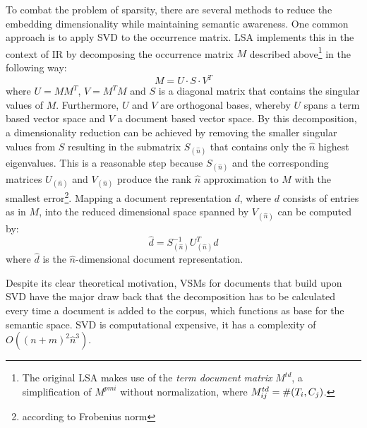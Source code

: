 To combat the problem of sparsity, there are several methods to reduce the embedding dimensionality while maintaining semantic awareness. One common approach is to apply \ac{SVD} \autocite{beltrami_sulle_1873} to the occurrence matrix. \ac{LSA} \autocite{deerwester_indexing_1990} implements this in the context of \ac{IR} by decomposing the occurrence matrix $M$ described above\footnote{The original \ac{LSA} makes use of the \textit{term document matrix} $M^{td}$, a simplification of $M^{pmi}$ without normalization, where $M^{td}_{ij} =\nobreak \#(T_i, C_j)$.} in the following way:
\begin{equation}
M = U \cdot S \cdot V^T
\end{equation}
where $U = MM^T$, $V = M^TM$ and $S$ is a diagonal matrix that contains the singular values of $M$. Furthermore, $U$ and $V$ are orthogonal bases, whereby $U$ spans a term based vector space and $V$ a document based vector space. By this decomposition, a dimensionality reduction can be achieved by removing the smaller singular values from $S$ resulting in the submatrix $S_{(\hat{n})}$ that contains only the $\hat{n}$ highest eigenvalues. This is a reasonable step because $S_{(\hat{n})}$ and the corresponding matrices $U_{(\hat{n})}$ and $V_{(\hat{n})}$ produce the rank $\hat{n}$ approximation to $M$ with the smallest error\footnote{according to Frobenius norm}\autocite{hofmann_unsupervised_2001}. Mapping a document representation $d$, where $d$ consists of entries as in $M$, into the reduced dimensional space spanned by $V_{(\hat{n})}$ can be computed by: 
\begin{equation} \label{eq:svd_doc}
\hat{d} = S_{(\hat{n})}^{-1}U_{(\hat{n})}^Td
\end{equation}
where $\hat{d}$ is the $\hat{n}$-dimensional document representation. 

Despite its clear theoretical motivation, \acp{VSM} for documents that build upon \ac{SVD} have the major draw back that the decomposition has to be calculated every time a document is added to the corpus, which functions as base for the semantic space. \ac{SVD} is computational expensive, it has a complexity of $O((n+m)^2\hat{n}^3)$. %

